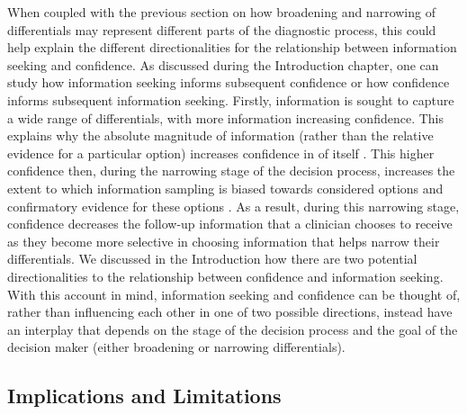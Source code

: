 \documentclass[a4paper, nobind]{templates/ociamthesis}
\begin{document}
When coupled with the previous section on how broadening and narrowing of differentials may represent different parts of the diagnostic process, this could help explain the different directionalities for the relationship between information seeking and confidence. As discussed during the Introduction chapter, one can study how information seeking informs subsequent confidence or how confidence informs subsequent information seeking. Firstly, information is sought to capture a wide range of differentials, with more information increasing confidence. This explains why the absolute magnitude of information (rather than the relative evidence for a particular option) increases confidence in of itself \autocite{ko_divergent_2022}. This higher confidence then, during the narrowing stage of the decision process, increases the extent to which information sampling is biased towards considered options \autocite{kaanders_humans_2022} and confirmatory evidence for these options \autocite{rollwage_confidence_2020}. As a result, during this narrowing stage, confidence decreases the follow-up information that a clinician chooses to receive \autocite{meyer_physicians_2013} as they become more selective in choosing information that helps narrow their differentials. We discussed in the Introduction how there are two potential directionalities to the relationship between confidence and information seeking. With this account in mind, information seeking and confidence can be thought of, rather than influencing each other in one of two possible directions, instead have an interplay that depends on the stage of the decision process and the goal of the decision maker (either broadening or narrowing differentials).

\subsection{Implications and Limitations}\label{implications-and-limitations-1}
\end{document}
